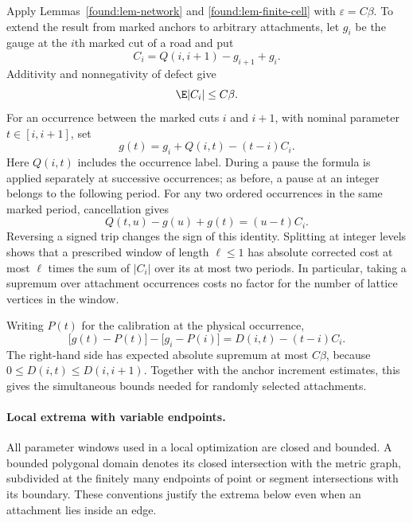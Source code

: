 Apply Lemmas~\ref{found:lem-network} and
\ref{found:lem-finite-cell} with $\varepsilon=C\beta$.  To extend the
result from marked anchors to arbitrary attachments, let $g_i$ be the
gauge at the $i$th marked cut of a road and put
\[
 C_i=Q(i,i+1)-g_{i+1}+g_i.
\]
Additivity and nonnegativity of defect give
\begin{equation}
 \E |C_i|\leq C\beta.                 \label{found:eq-slope}
\end{equation}
For an occurrence between the marked cuts $i$ and $i+1$, with nominal
parameter $t\in[i,i+1]$, set
\begin{equation}
 g(t)=g_i+Q(i,t)-(t-i)C_i.                  \label{found:eq-interpolation}
\end{equation}
Here $Q(i,t)$ includes the occurrence label.  During a pause the formula
is applied separately at successive occurrences; as before, a pause
at an integer belongs to the following period.  For any two ordered
occurrences in the same marked period, cancellation gives
\begin{equation}
 Q(t,u)-g(u)+g(t)=(u-t)C_i.                 \label{found:eq-short}
\end{equation}
Reversing a signed trip changes the sign of this identity.  Splitting
at integer levels shows that a prescribed window of length $\ell\le1$
has absolute corrected cost at most $\ell$ times the sum of $|C_i|$
over its at most two periods.  In particular, taking a supremum over
attachment occurrences costs no factor for the number of lattice
vertices in the window.

Writing $P(t)$ for the calibration at the physical occurrence,
\begin{equation}
 \bigl[g(t)-P(t)\bigr]-\bigl[g_i-P(i)\bigr]
       =D(i,t)-(t-i)C_i.                  \label{found:eq-interpolation-error}
\end{equation}
The right-hand side has expected absolute supremum at most $C\beta$,
because $0\le D(i,t)\le D(i,i+1)$.  Together with the anchor
increment estimates, this gives the simultaneous bounds needed for
randomly selected attachments.

\paragraph{Local extrema with variable endpoints.}
All parameter windows used in a local optimization are closed and
bounded. A bounded polygonal domain denotes its closed intersection
with the metric graph, subdivided at the finitely many endpoints of
point or segment intersections with its boundary. These conventions
justify the extrema below even when
an attachment lies inside an edge.

